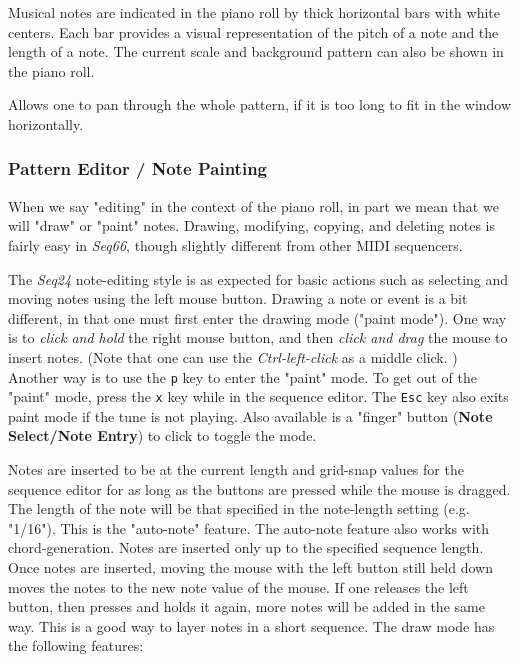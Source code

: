    Musical notes are indicated in the piano roll
   by thick horizontal bars with white
   centers.  Each bar provides
   a visual representation of the pitch of a note and the length of a note.
   The current scale and background pattern can also be shown in the piano
   roll.

   Allows one to pan through the whole pattern, if it is too long to fit in
   the window horizontally.

\subsubsection{Pattern Editor / Note Painting}
\label{subsubsec:pattern_editor_note_painting}

   When we say "editing" in the context of the piano roll, in part we mean that
   we will "draw"
   or "paint" notes.
   Drawing, modifying, copying, and deleting notes is fairly easy in
   \textsl{Seq66}, though slightly different from other MIDI sequencers.

   The \textsl{Seq24} note-editing style is as expected for basic
   actions such as selecting and moving notes using the left mouse button.
   Drawing a note or event is a bit different, in that one must first
   enter the drawing mode ("paint mode").
   One way is to \textsl{click and hold} the right mouse button, and then
   \textsl{click and drag} the mouse to insert notes.
   (Note that one can use the \textsl{Ctrl-left-click} as a middle click. )
   Another way is to use the \texttt{p} key to enter the "paint" mode.
   To get out of the "paint" mode, press the
   \texttt{x} key while in the sequence editor.
   The \texttt{Esc} key also exits paint mode if the tune is not playing.
   Also available is a "finger" button
   (\textbf{Note Select/Note Entry})
   to click to toggle the mode.

   Notes are inserted to be at the current length and grid-snap values for
   the sequence editor for as long as the buttons are pressed while the mouse
   is dragged.
   The length of the note will
   be that specified in the note-length setting (e.g. "1/16").
   This is the "auto-note" feature.
   The auto-note feature also works with chord-generation.
   Notes are inserted only up to the specified sequence length.
   Once notes are inserted, moving the mouse with the left button still
   held down moves the notes to the new note value of the mouse.
   If one releases the left button, then presses and holds it again,
   more notes will be added in the same way.
   This is a good way to layer notes in a short sequence.
   The draw mode has the following features:

